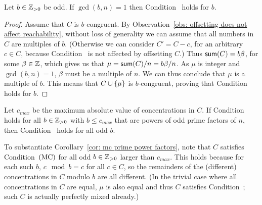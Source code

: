 
\begin{lemma}\label{lem: b's co-prime to n}
Let $b\in{\mathbb{Z}_{> 0}}$ be odd. If $\gcd(b,n) = 1$ then
Condition~{\MixCond} holds for $b$.
\end{lemma}

\begin{proof}
Assume that $C$ is $b$-congruent. 
By Observation~\ref{obs: offsetting does not affect reachability}, without loss of generality
we can assume that all numbers in $C$ are multiples of $b$. 
(Otherwise we can consider $C' = C-c$, for an arbitrary $c\in C$, 
because Condition~{\MixCond} is not affected by offsetting $C$.)
Thus ${\textsf{sum}}(C) = b\beta$, for some $\beta\in{\mathbb Z}$,
which gives us that $\mu = {\textsf{sum}}(C)/n = b\beta/n$.
As $\mu$ is integer and $\gcd(b,n) = 1$, $\beta$ must be a multiple of $n$.
We can thus conclude that $\mu$ is a multiple of $b$.
This means that $C\cup { \left\{ \mu \right\} }$ is $b$-congruent, proving that
Condition~{\MixCond} holds for $b$.
\end{proof}


\begin{corollary}\label{cor: mc prime power factors}
	Let $c_{max}$ be the maximum absolute value of concentrations in $C$. 
	If Condition~{\MixCond} holds for all $b\in{\mathbb{Z}_{> 0}}$ with $b\leq c_{max}$
	that are powers of odd prime factors of $n$,
	then Condition~{\MixCond} holds for all odd $b$.
\end{corollary}



To substantiate Corollary~\ref{cor: mc prime power factors},
note that $C$ satisfies Condition~${\textrm{(MC)}}$ 
for all odd $b\in{\mathbb{Z}_{> 0}}$ larger than $c_{max}$.
This holds because for each such $b$, $c\mod b=c$ for all $c\in C$, 
so the remainders of the (different) concentrations in $C$ modulo $b$ are all different. 
(In the trivial case where 
all concentrations in $C$ are equal, $\mu$ is also equal and thus
$C$ satisfies Condition~{\MixCond}; such $C$ is actually perfectly mixed already.)

